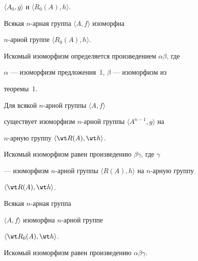 $\langle A_0,g\rangle $ и $\langle R_0(A),h\rangle$.





\begin{cor}


Всякая $n$-арная группа $\langle A,f\rangle $ изоморфна


$n$-арной группе $\langle R_0(A),h\rangle $.


\end{cor}





Искомый изоморфизм определяется произведением $\alpha\beta$, где


$\alpha$ --- изоморфизм предложения~1, $\beta$ --- изоморфизм из


теоремы~1.





\begin{cor}


Для всякой $n$-арной группы $\langle A, f\rangle $


существует изоморфизм $n$-арной группы $\langle A^{n-1},g\rangle $ на


$n$-арную группу $\langle \wt R(A),\wt h\rangle$.


\end{cor}





Искомый изоморфизм равен произведению $\beta\gamma$, где $\gamma$


--- изоморфизм $n$-арной группы $\langle R(A),h\rangle $ на $n$-арную группу


$\langle \wt R(A),\wt h\rangle $.





\begin{cor} Всякая $n$-арная группа


$\langle A,f\rangle $ изоморфна $n$-арной группе


$\langle \wt R_0(A),\wt h\rangle $.


\end{cor}





Искомый изоморфизм равен произведению $\alpha\beta\gamma$.





